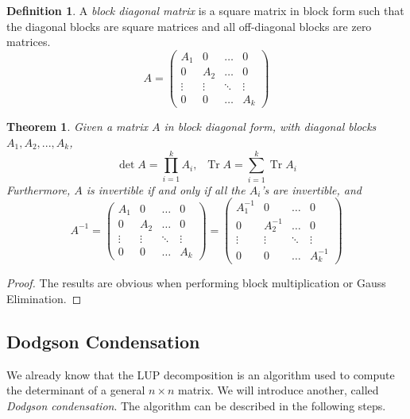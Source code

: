 \documentclass{article}
\DeclareMathOperator{\Tr}{Tr}
\newtheorem{theorem}{Theorem}[section]
\theoremstyle{remark}
\theoremstyle{definition}
\newtheorem{definition}{Definition}[section]
\begin{document}
\begin{definition}
A \textit{block diagonal matrix} is a square matrix in block form such that the diagonal blocks are square matrices and all off-diagonal blocks are zero matrices. 
\[A = \begin{pmatrix}
A_1&0&\ldots&0\\
0&A_2&\ldots&0\\
\vdots&\vdots&\ddots&\vdots\\
0&0&\ldots&A_k
\end{pmatrix}\]
\end{definition}

\begin{theorem}
Given a matrix $A$ in block diagonal form, with diagonal blocks $A_1, A_2, ..., A_k$,
\[\det{A} = \prod_{i=1}^k A_i, \; \; \Tr{A} = \sum_{i=1}^k \Tr{A_i}\]
Furthermore, $A$ is invertible if and only if all the $A_i$'s are invertible, and 
\[A^{-1} = \begin{pmatrix}
A_1&0&\ldots&0\\
0&A_2&\ldots&0\\
\vdots&\vdots&\ddots&\vdots\\
0&0&\ldots&A_k
\end{pmatrix} = \begin{pmatrix}
A_1^{-1}&0&\ldots&0\\
0&A_2^{-1}&\ldots&0\\
\vdots&\vdots&\ddots&\vdots\\
0&0&\ldots&A_k^{-1}
\end{pmatrix}\]
\end{theorem}
\begin{proof}
The results are obvious when performing block multiplication or Gauss Elimination. 
\end{proof}

\subsection{Dodgson Condensation}
We already know that the LUP decomposition is an algorithm used to compute the determinant of a general $n \times n$ matrix. We will introduce another, called \textit{Dodgson condensation}. The algorithm can be described in the following steps.
\end{document}
